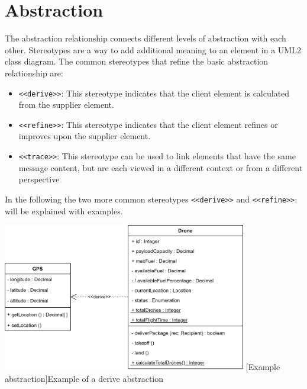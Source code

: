\documentclass[
	12pt,
    a4paper,
    egregdoesnotlikesansseriftitles, %
    toc=chapterentrywithdots,
    oneside, openany,
    titlepage,
    parskip=half,
    headings=normal,  %
    listof=totoc,
    bibliography=totoc,
    index=totoc,
    captions=tableheading,  %
    listof=flat,
    numbers=noenddot, %
    final]
    {scrbook}
\begin{document}
\section{Abstraction}
The abstraction relationship connects different levels of abstraction with each other.
Stereotypes are a way to add additional meaning to an element in a UML2 class diagram. 
The common stereotypes that refine the basic abstraction relationship are: \cite{ibm_dependencies}
\begin{itemize}
	\item \texttt{<<derive>>}: This stereotype indicates that the client element is calculated from the supplier element.
	\item \texttt{<<refine>>}: This stereotype indicates that the client element refines or improves upon the supplier element.
	\item \texttt{<<trace>>}: This stereotype can be used to link elements that have the same message content, but are each viewed in a different context or from a different perspective
\end{itemize}


In the following the two more common stereotypes \texttt{<<derive>>} and \texttt{<<refine>>}: will be explained with examples.


\vspace{1em}
\begin{minipage}{\linewidth}
	\centering
	\includegraphics[width=0.8\textwidth]{figures/dependencies/derive.jpg}
	[Example abstraction]{Example of a derive abstraction}
	\label{fig:derive_example}
\end{minipage}
\vspace{1em}
\end{document}
